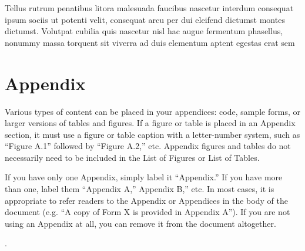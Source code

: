 Tellus rutrum penatibus litora malesuada faucibus nascetur interdum
consequat ipsum sociis ut potenti velit, consequat arcu per dui eleifend
dictumst montes dictumst. Volutpat cubilia quis nascetur nisl hac augue
fermentum phasellus, nonummy massa torquent sit viverra ad duis
elementum aptent egestas erat sem

\hypertarget{appendix}{%
\section{Appendix}\label{appendix}}

Various types of content can be placed in your appendices: code, sample
forms, or larger versions of tables and figures. If a figure or table is
placed in an Appendix section, it must use a figure or table caption
with a letter-number system, such as ``Figure A.1'' followed by ``Figure
A.2,'' etc. Appendix figures and tables do not necessarily need to be
included in the List of Figures or List of Tables.

If you have only one Appendix, simply label it ``Appendix.'' If you have
more than one, label them ``Appendix A,'' Appendix B,'' etc. In most
cases, it is appropriate to refer readers to the Appendix or Appendices
in the body of the document (e.g. ``A copy of Form X is provided in
Appendix A''). If you are not using an Appendix at all, you can remove
it from the document altogether.

.
